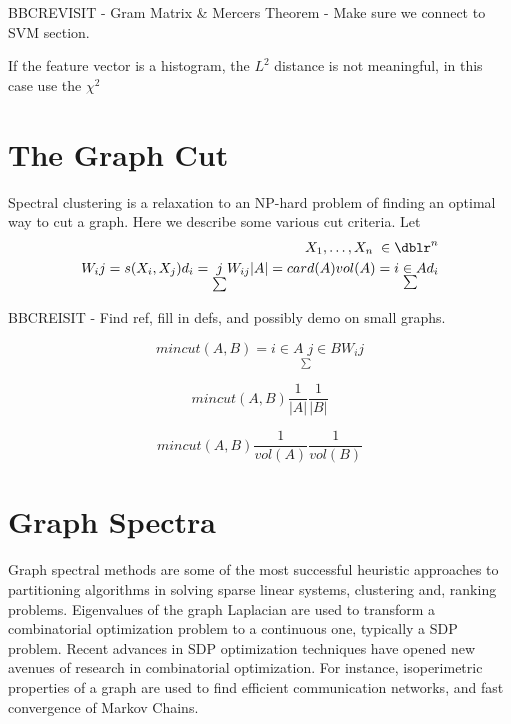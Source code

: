 BBCREVISIT - Gram Matrix \& Mercers Theorem - Make sure we connect to SVM section.

If the feature vector is a histogram, the $L^2$ distance is not meaningful, in this case use the $\chi^2$

\section{The Graph Cut}
Spectral clustering is a relaxation to an NP-hard problem of finding an optimal way to cut a graph. Here we describe some various cut criteria.  Let
\begin{eqnarray*}
X_1, \hdots , X_n \; \in \dblr^n  \\
W_ij = s(X_i,X_j)
d_i = \underset{\sum}{j} W_{i j}
|A| = card (A)
vol(A) = \underset{\sum}{i \in A} d_i
\end{eqnarray*}

BBCREISIT - Find ref, fill in defs, and possibly demo on small graphs.
\begin{defn}
\begin{equation*} min cut(A,B) =\underset{\sum}{i \in A \; j \in B}  W_ij \end{equation*}
\end{defn}

\begin{defn}
\begin{equation*} min cut (A,B) \frac{1}{|A|} \frac{1}{|B|} \end{equation*}
\end{defn}

\begin{defn}[n Cut ]
\begin{equation*} min cut (A,B) \frac{1}{vol(A)} \frac{1}{vol(B)} \end{equation*}
\end{defn}



\section{Graph Spectra}
Graph spectral methods are some of the most successful heuristic approaches to partitioning algorithms in solving sparse linear systems, clustering and, ranking problems.  Eigenvalues of the graph Laplacian are used to transform a combinatorial optimization problem to a continuous one, typically a SDP problem.  Recent advances in SDP optimization techniques have opened new avenues of research in combinatorial optimization.  For instance, isoperimetric properties of a graph are used to find efficient communication networks, and fast convergence of Markov Chains.



